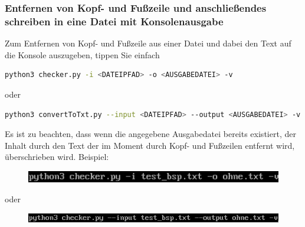 \documentclass[12pt]{scrartcl}
\begin{document}
\subsubsection{Entfernen von Kopf- und Fußzeile und anschließendes schreiben in eine Datei mit Konsolenausgabe}
\label{sec:first-steps-extraction-file-with}
Zum Entfernen von Kopf- und Fußzeile aus einer Datei und dabei den Text auf die Konsole auszugeben, tippen Sie einfach
\begin{lstlisting}[language=bash]
python3 checker.py -i <DATEIPFAD> -o <AUSGABEDATEI> -v
\end{lstlisting}
\begin{center}
oder
\end{center}
\begin{lstlisting}[language=bash] 
python3 convertToTxt.py --input <DATEIPFAD> --output <AUSGABEDATEI> -v
\end{lstlisting}
Es ist zu beachten, dass wenn die angegebene Ausgabedatei bereits existiert, der Inhalt durch den Text der im Moment durch Kopf- und Fußzeilen entfernt wird, überschrieben wird. 
Beispiel:
\begin{figure}[htbp]
\includegraphics[width=1.0\textwidth]{ersteSchritteKopfFussIntoFileWithConsole001}\par\vspace{0.25cm}
\label{fig:ersteSchritteKopfFussIntoFileWithConsole001}
\end{figure}
\begin{center}
oder
\end{center}
\begin{figure}[htbp]
\includegraphics[width=1.0\textwidth]{ersteSchritteKopfFussIntoFileWithConsole002}\par

\vspace{0.25cm}
\label{fig:ersteSchritteKopfFussIntoFileWithConsole002}
\end{figure}
\begin{figure}[htbp]
\centering
\end{figure}
\newpage
\end{document}
